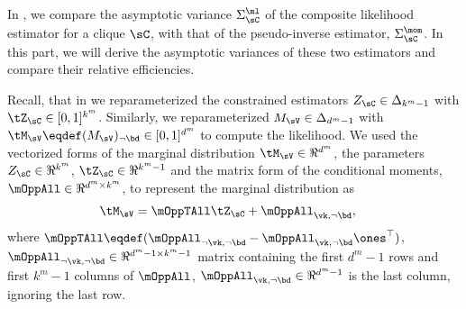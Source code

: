 \subsection{}
\label{app:pw-proof}

In , we compare the asymptotic variance
  $\Sigma^\ml_\sC$ of the composite likelihood estimator for a clique
  $\sC$, with that of the pseudo-inverse estimator, $\Sigma^\mom_\sC$. 
In this part, we will derive the asymptotic variances of these two
  estimators and compare their relative efficiencies.

Recall, that in  we reparameterized the
  constrained estimators $Z_\sC \in \Delta_{k^m-1}$ with $\tZ_\sC \in
  [0,1]^{k^m}$. 
Similarly, we reparameterized $M_\sV \in \Delta_{d^m - 1}$ with
  $\tM_\sV \eqdef (M_\sV)_{\neg \bd} \in [0,1]^{d^m}$ to compute
  the likelihood.
We used the vectorized forms of the marginal distribution $\tM_\sV \in
  \Re^{d^m}$, the parameters $Z_\sC \in \Re^{k^m}$, $\tZ_\sC \in
  \Re^{k^m-1}$ and the matrix form of the conditional moments, $\mOppAll
  \in \Re^{d^m \times k^m}$, to represent the marginal distribution as
\begin{align*}
  \tM_\sV &= \mOppTAll \tZ_\sC + \mOppAll_{\vk, \neg \bd},
\end{align*}
where $\mOppTAll \eqdef (\mOppAll_{\neg \vk, \neg \bd}
- \mOppAll_{\vk, \neg \bd}\ones^\top)$, $\mOppAll_{\neg \vk, \neg \bd} \in \Re^{d^m - 1 \times
k^m - 1}$ matrix containing the first $d^m-1$ rows and first $k^m-1$ columns of $\mOppAll$,
$\mOppAll_{\vk,\neg \bd} \in \Re^{d^m-1}$ is the last column, ignoring the last row.

